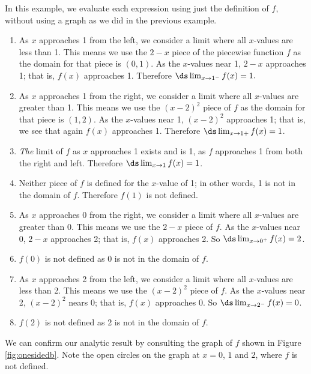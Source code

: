 {In this example, we evaluate each expression using just the definition of $f$, without using a graph as we did in the previous example.
		\begin{enumerate}
		\item		As $x$ approaches 1 from the left, we consider a limit where all $x$-values are less than 1. This means we use the $2-x$ piece of the piecewise function $f$ as the domain for that piece is $(0,1)$. As the $x$-values near 1, $2-x$ approaches 1; that is, $f(x)$ approaches 1. Therefore $\ds \lim_{x\to 1^-} f(x)=1.$
		\item		As $x$ approaches 1 from the right, we consider a limit where all $x$-values are greater than 1. This means we use the $(x-2)^2$ piece of $f$ as the domain for that piece is $(1,2)$. As the $x$-values near 1, $(x-2)^2$ approaches 1; that is, we see that again $f(x)$ approaches 1. Therefore $\ds \lim_{x\to 1+} f(x)=1$.
		\item		\textit{The} limit of $f$ as $x$ approaches 1 exists and is 1, as $f$ approaches 1 from both the right and left. Therefore $\ds \lim_{x\to 1} f(x)=1$.
		\item		Neither piece of $f$ is defined for the $x$-value of 1; in other words, 1 is not in the domain of $f$. Therefore $f(1)$ is not defined.  %
		\item		As $x$ approaches  0 from the right, we consider a limit where all $x$-values are greater than 0. This means we use the $2-x$ piece of $f$. As the $x$-values near 0, $2-x$ approaches 2; that is, $f(x)$ approaches 2. So $\ds \lim_{x\to 0^+} f(x)=2$.
		\item		$f(0)$  is not defined as $0$ is not in the domain of $f$.
		\item		As $x$ approaches  2 from the left, we consider a limit where all $x$-values are less than 2. This means we use the $(x-2)^2$ piece of $f$. As the $x$-values near 2, $(x-2)^2$ nears 0; that is, $f(x)$ approaches 0. So $\ds \lim_{x\to 2^-} f(x)=0$.
		\item		$f(2)$  is not defined as 2 is not in the domain of $f$.
		\end{enumerate}
We can confirm our analytic result by consulting the graph of $f$ shown in Figure \ref{fig:onesidedb}.	Note the open circles on the graph at $x=0$, $1$ and $2$, where $f$ is not defined.	
}\\

